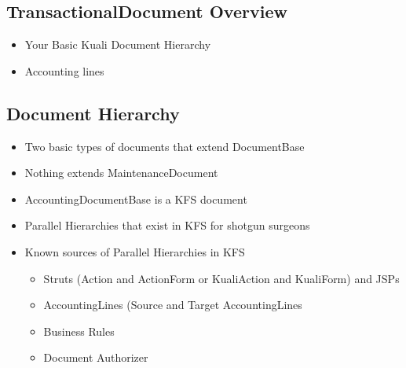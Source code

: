 \begin{ifhtml}
    \begin{s5slide}
      \section{TransactionalDocument Overview}
      \begin{itemize}
      \item Your Basic Kuali Document Hierarchy
      \item Accounting lines
      \end{itemize}
      
      \begin{s5notes}
        
      \end{s5notes}
    \end{s5slide}
    
    \begin{s5slide}
      \section{Document Hierarchy}
      \begin{itemize}
      \item Two basic types of documents that extend DocumentBase
      \item Nothing extends MaintenanceDocument
      \item {}AccountingDocumentBase is a KFS document
      \item Parallel Hierarchies that exist in KFS for shotgun surgeons
      \item Known sources of Parallel Hierarchies in KFS
        \begin{itemize}
        \item Struts (Action and ActionForm or KualiAction and KualiForm) and JSPs
        \item AccountingLines (Source and Target AccountingLines
        \item Business Rules
        \item Document Authorizer
        \end{itemize}
      \end{itemize}      

      \begin{slideshow}
      \item {}      
      \item {}      
      \end{slideshow}
    \end{s5slide}


\end{ifhtml}
